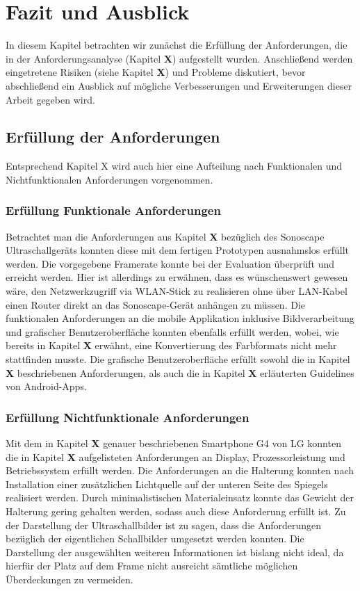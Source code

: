 \chapter{Fazit und Ausblick}
In diesem Kapitel betrachten wir zunächst die Erfüllung der Anforderungen, die in der Anforderungsanalyse (Kapitel \textbf{X}) aufgestellt wurden. Anschließend werden eingetretene Risiken (siehe Kapitel \textbf{X}) und Probleme diskutiert, bevor abschließend ein Ausblick auf mögliche Verbesserungen und Erweiterungen dieser Arbeit gegeben wird.
\section{Erfüllung der Anforderungen}
Entsprechend Kapitel X wird auch hier eine Aufteilung nach Funktionalen und Nichtfunktionalen Anforderungen vorgenommen.
\subsection{Erfüllung Funktionale Anforderungen}
Betrachtet man die Anforderungen aus Kapitel \textbf{X} bezüglich des Sonoscape Ultraschallgeräts konnten diese mit dem fertigen Prototypen ausnahmslos erfüllt werden. Die vorgegebene Framerate konnte bei der Evaluation überprüft und erreicht werden. Hier ist allerdings zu erwähnen, dass es wünschenswert gewesen wäre, den Netzwerkzugriff via WLAN-Stick zu realisieren ohne über LAN-Kabel einen Router direkt an das Sonoscape-Gerät anhängen zu müssen. Die funktionalen Anforderungen an die mobile Applikation inklusive Bildverarbeitung und grafischer Benutzeroberfläche konnten ebenfalls erfüllt werden, wobei, wie bereits in Kapitel \textbf{X} erwähnt, eine Konvertierung des Farbformats nicht mehr stattfinden musste. Die grafische Benutzeroberfläche erfüllt sowohl die in Kapitel \textbf{X} beschriebenen Anforderungen, als auch die in Kapitel \textbf{X} erläuterten Guidelines von Android-Apps.
\subsection{Erfüllung Nichtfunktionale Anforderungen}
Mit dem in Kapitel \textbf{X} genauer beschriebenen Smartphone G4 von LG konnten die in Kapitel \textbf{X} aufgelisteten Anforderungen an Display, Prozessorleistung und Betriebssystem erfüllt werden. Die Anforderungen an die Halterung konnten nach Installation einer zusätzlichen Lichtquelle auf der unteren Seite des Spiegels realisiert werden. Durch minimalistischen Materialeinsatz konnte das Gewicht der Halterung gering gehalten werden, sodass auch diese Anforderung erfüllt ist. Zu der Darstellung der Ultraschallbilder ist zu sagen, dass die Anforderungen bezüglich der eigentlichen Schallbilder umgesetzt werden konnten. Die Darstellung der ausgewählten weiteren Informationen ist bislang nicht ideal, da hierfür der Platz auf dem Frame nicht ausreicht sämtliche möglichen Überdeckungen zu vermeiden.
